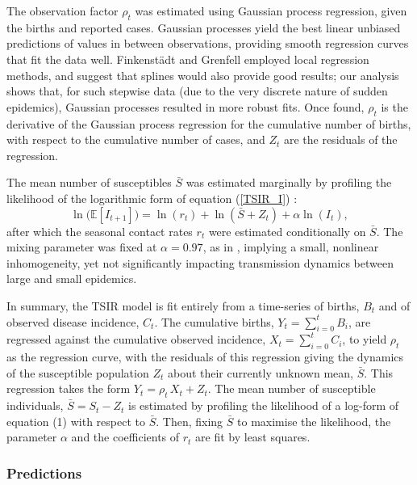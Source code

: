 \documentclass[10pt]{article}
\begin{document}
The observation factor $\rho_t$ was estimated using Gaussian process regression, given the births and reported cases. Gaussian processes yield the best linear unbiased predictions of values in between observations, providing smooth regression curves that fit the data well. Finkenst\"{a}dt and Grenfell \cite{Finkenstadt2000} employed local regression methods, and suggest that splines would also provide good results; our analysis shows that, for such stepwise data (due to the very discrete nature of sudden epidemics), Gaussian processes resulted in more robust fits. Once found, $\rho_t$ is the derivative of the Gaussian process regression for the cumulative number of births, with respect to the cumulative number of cases, and $Z_t$ are the residuals of the regression.

The mean number of susceptibles $\bar{S}$ was estimated marginally by profiling the likelihood of the logarithmic form of equation (\ref{TSIR_I}) :
\begin{equation}
\ln\big(\mathbb{E}\left[I_{t+1}\right]\big) = \ln(r_t) + \ln\left(\bar{S} + Z_t\right) + \alpha \ln\left(I_t\right),
\label{log}
\end{equation}
after which the seasonal contact rates $r_t$ were estimated conditionally on $\bar{S}$. The mixing parameter was fixed at $\alpha = 0.97$, as in \cite{Metcalf2010}, implying a small, nonlinear inhomogeneity, yet not significantly impacting transmission dynamics between large and small epidemics. 

In summary, the TSIR model is fit entirely from a time-series of births, $B_t$ and of observed disease incidence, $C_t$. The cumulative births, $Y_t = \sum_{i=0}^t B_i$, are regressed against the cumulative observed incidence, $X_t = \sum_{i=0}^t C_i$, to yield $\rho_t$ as the regression curve, with the residuals of this regression giving the dynamics of the susceptible population $Z_t$ about their currently unknown mean, $\bar{S}$. This regression takes the form $Y_t = \rho_t\,X_t + Z_t$. The mean number of susceptible individuals, $\bar{S} = S_t - Z_t$ is estimated by profiling the likelihood of a log-form of equation (1) with respect to $\bar{S}$. Then, fixing $\bar{S}$ to maximise the likelihood, the parameter $\alpha$ and the coefficients of $r_t$ are fit by least squares.






\subsubsection*{Predictions}
\end{document}
